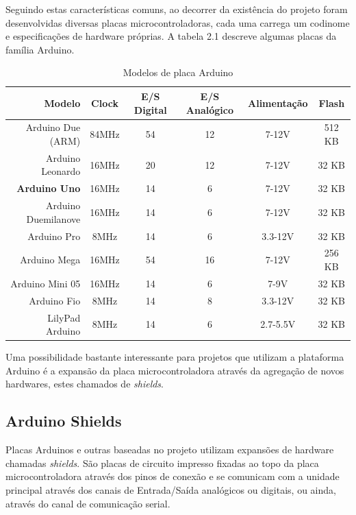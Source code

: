 Seguindo estas características comuns, ao decorrer da existência do projeto foram desenvolvidas diversas placas microcontroladoras, cada uma carrega um codinome e especificações de hardware próprias. A tabela 2.1 descreve algumas placas da família Arduino.

\begin{table}[!h]
\caption{Modelos de placa Arduino}

	\begin{tabular}{|r|c|c|c|c|c|}
		\hline 
			\textbf{Modelo} & \textbf{Clock} & \textbf{E/S Digital} & \textbf{E/S Analógico} & \textbf{Alimentação} & \textbf{Flash}
		\\
		\hline
			Arduino Due (ARM) & 84MHz & 54 & 12 & 7-12V & 512 KB
		\\
		\hline
			Arduino Leonardo & 16MHz & 20 & 12 & 7-12V & 32 KB
		\\
		\hline
			\textbf{Arduino Uno} & 16MHz & 14 & 6 & 7-12V & 32 KB
		\\
		\hline
			Arduino Duemilanove & 16MHz & 14 & 6 & 7-12V & 32 KB
		\\
		\hline
			Arduino Pro & 8MHz & 14 & 6 & 3.3-12V & 32 KB
		\\
		\hline
			Arduino Mega & 16MHz & 54 & 16 & 7-12V & 256 KB
		\\
		\hline
			Arduino Mini 05 & 16MHz & 14 & 6 & 7-9V & 32 KB
		\\
		\hline
			Arduino Fio & 8MHz & 14 & 8 & 3.3-12V & 32 KB
		\\
		\hline
			LilyPad Arduino & 8MHz & 14 & 6 & 2.7-5.5V & 32 KB
		\\


\hline
\end{tabular}
\end{table}

Uma possibilidade bastante interessante para projetos que utilizam a plataforma Arduino é a expansão da placa microcontroladora através da agregação de novos hardwares, estes chamados de \textit{shields}.

\subsection{Arduino Shields}

Placas Arduinos e outras baseadas no projeto utilizam expansões de hardware chamadas \textit{shields}. São placas de circuito impresso fixadas ao topo da placa microcontroladora através dos pinos de conexão e se comunicam com a unidade principal através dos canais de Entrada/Saída analógicos ou digitais, ou ainda, através do canal de comunicação serial.

